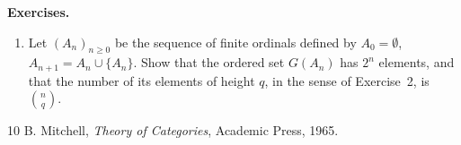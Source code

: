 \documentclass[11pt]{article}
\newenvironment{remarktext}[1]{\par\medskip\noindent\textbf{#1.}\ }{\par\medskip}
\begin{document}
\begin{remarktext}{Exercises}
\begin{enumerate}[label=\arabic*)]
\item Let \((A_n)_{n\geq0}\) be the sequence of finite ordinals defined by \(A_0=\emptyset\), \(A_{n+1}=A_n\cup\{A_n\}\). Show that the ordered set \(G(A_n)\) has \(2^n\) elements, and that the number of its elements of height \(q\), in the sense of Exercise~2, is \(\binom{n}{q}\).
\end{enumerate}
\end{remarktext}

\begin{thebibliography}{10}
 B. Mitchell, \emph{Theory of Categories}, Academic Press, 1965.
\end{thebibliography}
\end{document}
